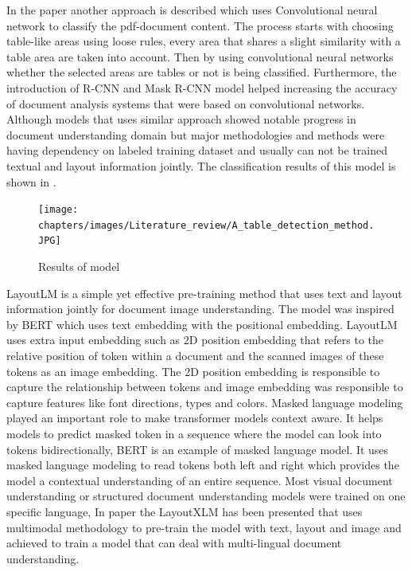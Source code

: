 In the paper \cite{hao2016table} another approach is described which uses Convolutional neural network to classify the pdf-document content. The process starts with choosing table-like areas using loose rules, every area that shares a slight similarity with a table area are taken into account. Then by using convolutional neural networks whether the selected areas are tables or not is being classified. Furthermore, the introduction of R-CNN \cite{ren2015faster} and Mask R-CNN \cite{he2017mask} model helped increasing the accuracy of document analysis systems that were based on convolutional networks. Although models that uses similar approach showed notable progress in document understanding domain but major methodologies and methods were having dependency on labeled training dataset and usually can not be trained textual and layout information jointly. The classification results of this model is shown in .

\begin{figure}[ht]
    \centering
    \texttt{[image: chapters/images/Literature\_review/A\_table\_detection\_method.JPG]}
    \caption{Results of \cite{hao2016table} model}
    \label{fig:Results_tabel_detection}
\end{figure}

LayoutLM \cite{xu2020layoutlm} is a simple yet effective pre-training method that uses text and layout information jointly for document image understanding.  The model was inspired by BERT \cite{devlin2018bert} which uses text embedding with the positional embedding. LayoutLM uses extra input embedding such as 2D position embedding that refers to the relative position of token within a document and the scanned images of these tokens as an image embedding. The 2D position embedding is responsible to capture the relationship between tokens and image embedding was responsible to capture features like font directions, types and colors. Masked language modeling played an important role to make transformer models context aware. It helps models to predict masked token in a sequence where the model can look into tokens bidirectionally, BERT is an example of masked language model. It uses masked language modeling to read tokens both left and right which provides the model a contextual understanding of an entire sequence. Most visual document understanding or structured document understanding models were trained on one specific language, In paper \cite{xu2021layoutxlm} the LayoutXLM has been presented that uses multimodal methodology to pre-train the model with text, layout and image and achieved to train a model that can  deal with multi-lingual document understanding.   


